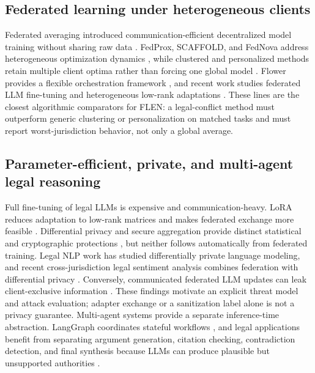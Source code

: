 \documentclass[preprint,12pt,authoryear]{elsarticle}
\begin{document}
\subsection{Federated learning under heterogeneous clients}

Federated averaging introduced communication-efficient decentralized model training without sharing raw data \citep{mcmahan2017communication}. FedProx, SCAFFOLD, and FedNova address heterogeneous optimization dynamics \citep{li2020fedprox,karimireddy2020scaffold,wang2020fednova}, while clustered and personalized methods retain multiple client optima rather than forcing one global model \citep{sattler2021clustered,li2021ditto}. Flower provides a flexible orchestration framework \citep{beutel2020flower}, and recent work studies federated LLM fine-tuning and heterogeneous low-rank adaptations \citep{Wang2024FLoRAFF,Wu2026ASO,Cheng2025TowardFL}. These lines are the closest algorithmic comparators for FLEN: a legal-conflict method must outperform generic clustering or personalization on matched tasks and must report worst-jurisdiction behavior, not only a global average.

\subsection{Parameter-efficient, private, and multi-agent legal reasoning}

Full fine-tuning of legal LLMs is expensive and communication-heavy. LoRA reduces adaptation to low-rank matrices and makes federated exchange more feasible \citep{hu2022lora}. Differential privacy and secure aggregation provide distinct statistical and cryptographic protections \citep{abadi2016deep,bonawitz2017practical}, but neither follows automatically from federated training. Legal NLP work has studied differentially private language modeling, and recent cross-jurisdiction legal sentiment analysis combines federation with differential privacy \citep{yin2022privacy,xu2025crossjurisdiction}. Conversely, communicated federated LLM updates can leak client-exclusive information \citep{Hu2025SimpleYE}. These findings motivate an explicit threat model and attack evaluation; adapter exchange or a sanitization label alone is not a privacy guarantee. Multi-agent systems provide a separate inference-time abstraction. LangGraph coordinates stateful workflows \citep{langgraph2024}, and legal applications benefit from separating argument generation, citation checking, contradiction detection, and final synthesis because LLMs can produce plausible but unsupported authorities \citep{dahl2024large}.
\end{document}

